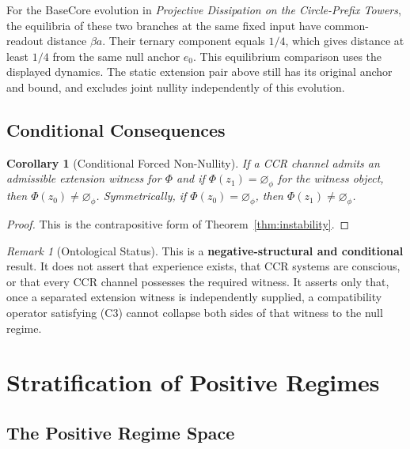 \documentclass[11pt,a4paper]{article}
\theoremstyle{plain}
\newtheorem{corollary}[theorem]{Corollary}
\theoremstyle{definition}
\theoremstyle{remark}
\newtheorem{remark}[theorem]{Remark}
\newcommand{\nullphi}{\varnothing_\phi}
\begin{document}
For the BaseCore evolution in \emph{Projective Dissipation on the Circle-Prefix Towers}, the equilibria of these two branches at the same fixed input have common-readout distance $\beta a$. Their ternary component equals $1/4$, which gives distance at least $1/4$ from the same null anchor $e_0$. This equilibrium comparison uses the displayed dynamics. The static extension pair above still has its original anchor and bound, and excludes joint nullity independently of this evolution.


\subsection{Conditional Consequences}

\begin{corollary}[Conditional Forced Non-Nullity]\label{cor:forced}
If a CCR channel admits an admissible extension witness for $\Phi$ and if $\Phi(z_1)=\nullphi$ for the witness object, then $\Phi(z_0)\neq\nullphi$. Symmetrically, if $\Phi(z_0)=\nullphi$, then $\Phi(z_1)\neq\nullphi$.
\end{corollary}

\begin{proof}
This is the contrapositive form of Theorem~\ref{thm:instability}.
\end{proof}

\begin{remark}[Ontological Status]
This is a \textbf{negative-structural and conditional} result. It does not assert that experience exists, that CCR systems are conscious, or that every CCR channel possesses the required witness. It asserts only that, once a separated extension witness is independently supplied, a compatibility operator satisfying (C3) cannot collapse both sides of that witness to the null regime.
\end{remark}

\section{Stratification of Positive Regimes}

\subsection{The Positive Regime Space}
\end{document}
